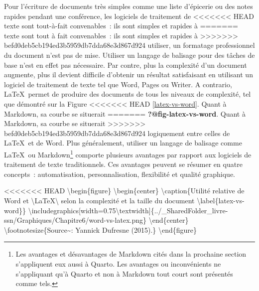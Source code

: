 \documentclass[
  letterpaper,
]{scrbook}
\begin{document}
Pour l'écriture de documents très simples comme une liste d'épicerie ou
des notes rapides pendant une conférence, les logiciels de traitement de
<<<<<<< HEAD
texte sont tout-à-fait convenables~: ils sont simples et rapides à
=======
texte sont tout à fait convenables~: ils sont simples et rapides à
>>>>>>> befd0deb5cb194ed3b5959db7dda68e3d867d924
utiliser, un formatage professionnel du document n'est pas de mise.
Utiliser un langage de balisage pour des tâches de base n'est en effet
pas nécessaire. Par contre, plus la complexité d'un document augmente,
plus il devient difficile d'obtenir un résultat satisfaisant en
utilisant un logiciel de traitement de texte tel que Word, Pages ou
Writer. A contrario, \LaTeX~permet de produire des documents de tous les
niveaux de complexité, tel que démontré sur la Figure
<<<<<<< HEAD
\ref{latex-vs-word}. Quant à Markdown, sa courbe se situerait
=======
\textbf{?@fig-latex-vs-word}. Quant à Markdown, sa courbe se situerait
>>>>>>> befd0deb5cb194ed3b5959db7dda68e3d867d924
logiquement entre celles de \LaTeX~et de Word. Plus généralement,
utiliser un langage de balisage comme \LaTeX~ou Markdown\footnote{Les
  avantages et désavantages de Markdown cités dans la prochaine section
  s'appliquent eux aussi à Quarto. Les avantages ou inconvénients ne
  s'appliquant qu'à Quarto et non à Markdown tout court sont présentés
  comme tels.} comporte plusieurs avantages par rapport aux logiciels de
traitement de texte traditionnels. Ces avantages peuvent se résumer en
quatre concepts~: automatisation, personnalisation, flexibilité et
qualité graphique.

<<<<<<< HEAD
\textbackslash begin\{figure\} \textbackslash begin\{center\}
\textbackslash caption\{Utilité relative de Word et
\textbackslash LaTeX\textbackslash{} selon la complexité et la taille du
document \textbackslash label\{latex-vs-word\}\}
\textbackslash includegraphics{[}width=0.75\textbackslash textwidth{]}\{../\_SharedFolder\_livre-ssn/Graphiques/Chapitre6/word-vs-latex.png\}
\textbackslash end\{center\}
\textbackslash footnotesize\{Source\textasciitilde: Yannick Dufresne
(2015).\} \textbackslash end\{figure\}
\end{document}
